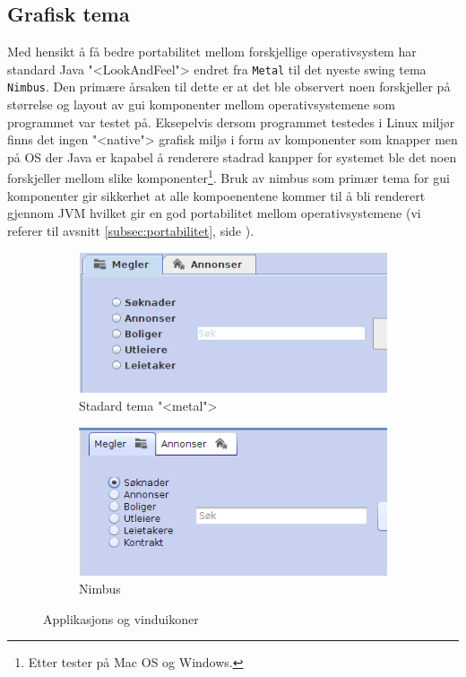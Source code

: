 \subsection{Grafisk tema}
Med hensikt å få bedre portabilitet mellom forskjellige operativsystem har standard Java "<LookAndFeel"> endret fra \texttt{Metal} til det nyeste swing tema \texttt{Nimbus}. Den primære årsaken til dette er at det ble observert noen forskjeller på størrelse og layout av gui komponenter mellom operativsystemene som programmet var testet på. Eksepelvis dersom programmet testedes i Linux miljør finns det ingen "<native"> grafisk miljø i form av komponenter som knapper men på OS der Java er kapabel å renderere stadrad kanpper for systemet ble det noen forskjeller mellom slike komponenter\footnote{Etter tester på Mac OS og Windows.}. Bruk av nimbus som primær tema for gui komponenter gir sikkerhet at alle kompoenentene kommer til å bli renderert gjennom JVM hvilket gir en god portabilitet mellom operativsystemene (vi referer til avsnitt \ref{subsec:portabilitet}, side \pageref{subsec:portabilitet}).

\begin{figure}[ht!]
\centering
\begin{subfigure}[b]{0.3\textwidth}
\centering
\includegraphics[trim=0cm 0cm 7cm 0cm, clip,scale=0.5]{./img/produktdokumentasjon/visuelle_detaljer/metal.png}
\caption{Stadard tema "<metal">}
\end{subfigure}
\begin{subfigure}[b]{0.3\textwidth}
\centering
\includegraphics[trim=0cm 0cm 7cm 0.2cm, clip,scale=0.5]{./img/produktdokumentasjon/visuelle_detaljer/nimbus.png}
\caption{Nimbus}
\end{subfigure}
\caption{Applikasjons og vinduikoner}\label{fig:tema}
\end{figure}
